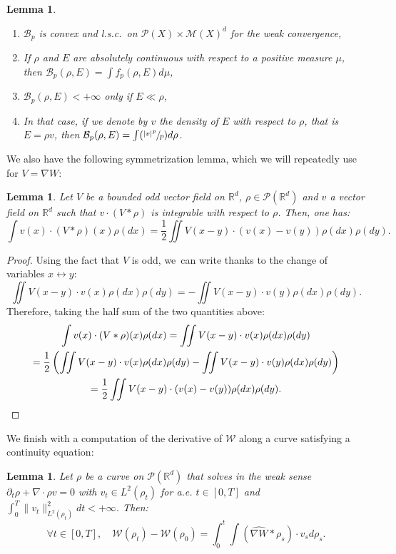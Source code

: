 \documentclass[JEP,XML,SOM,Unicode, NoFloatCountersInSection,published]{cedram}
\newenvironment{enumeratei}
{\bgroup\def\theenumi{\roman{enumi}}\def\theenumii{\arabic{enumii}}\begin{enumerate}}
{\end{enumerate}\egroup}
\newcommand{\Psfrac}[2]{(\sfrac{#1}{#2})}
\def\RR{\mathbb{R}}
\def\pa{\partial}
\def\calB{{\mathcal B}}
\def\calM{{\mathcal M}}
\def\calP{{\mathcal P}}
\def\calW{{\mathcal W}}
\def\nabWchapo{\widehat{\nabla W}}
\theoremstyle{plain}
\newtheorem{lemma}[theorem]{Lemma}
\theoremstyle{definition}
\begin{document}
\skpt
\begin{lemma}\label{lemma:BenamouBrenier}
\begin{enumeratei}
\item $\calB_p$ is convex and l.s.c.\ on $\calP(X) \times \calM(X)^d$ for the weak convergence,
\item If $\rho$ and $E$ are absolutely continuous with respect to a positive measure $\mu$, then $\calB_p(\rho, E) = \int f_p(\rho, E) d\mu$,
\item $\calB_p(\rho, E) < +\infty$ only if $E \ll \rho$,
\item In that case, if we denote by $v$ the density of $E$ with respect to $\rho$, that is $E = \rho v$, then $\calB_p(\rho, E) = \int \Psfrac{|v|^p}{p} d\rho$.
\end{enumeratei}
\end{lemma}
We also have the following symmetrization lemma, which we will repeatedly use for $V = \nabla W$:
\begin{lemma}\label{lemma:symmetrization}
Let $V$ be a bounded odd vector field on $\RR^d$, $\rho \in \calP(\RR^d)$ and $v$ a vector field on $\RR^d$ such that $v \cdot (V * \rho)$ is integrable with respect to $\rho$. Then, one has:
\[
\int v(x) \cdot (V * \rho)(x) \rho(dx) = \frac{1}{2} \iint V(x-y) \cdot (v(x)-v(y)) \rho(dx) \rho(dy).
\]
\end{lemma}
\begin{proof}
Using the fact that $V$ is odd, we~can write thanks to the change of variables $x \leftrightarrow y$:
\[
\iint V(x-y) \cdot v(x) \rho(dx) \rho(dy) = - \iint V(x-y) \cdot v(y) \rho(dx) \rho(dy).
\]
Therefore, taking the half sum of the two quantities above:
\begin{multline*}
\int v(x) \cdot (V * \rho)(x) \rho(dx) = \iint V(x-y) \cdot v(x) \rho(dx) \rho(dy) \\
= \frac 12 \left(\iint V(x-y) \cdot v(x) \rho(dx) \rho(dy)
- \iint V(x-y) \cdot v(y) \rho(dx) \rho(dy) \right) \\
= \frac{1}{2} \iint V(x-y) \cdot (v(x)-v(y)) \rho(dx) \rho(dy).\qedhere
\end{multline*}
\end{proof}
We finish with a computation of the derivative of $\calW$ along a curve satisfying a continuity equation:
\begin{lemma}\label{lemma:derEnergieInteraction}
Let $\rho$ be a curve on $\calP(\RR^d)$ that solves in the weak sense $\pa_t \rho + \nabla \cdot \rho v = 0$ with $v_t \in L^2(\rho_t)$ for a.e. $t \in [0,T]$ and $\int_0^T \|v_t\|_{L^2(\rho_t)}^2 dt < +\infty$. Then:
\begin{equation*}\label{eq:derEnergieInteraction}
\forall t \in [0,T], \quad \calW(\rho_t) - \calW(\rho_0) = \int_0^t \int (\nabWchapo * \rho_s) \cdot v_s d\rho_s.
\end{equation*}
\end{lemma}
\end{document}
